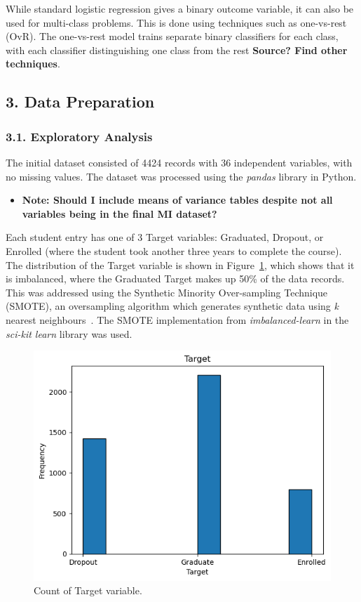 \documentclass[12pt]{article}
\begin{document}
While standard logistic regression gives a binary outcome variable, it can also be used for multi-class problems. This is done using techniques such as one-vs-rest (OvR). The one-vs-rest model trains separate binary classifiers for each class, with each classifier distinguishing one class from the rest \textbf{Source? Find other techniques}.

\newpage
\subsection*{3. Data Preparation}
\subsubsection*{3.1. Exploratory Analysis}
The initial dataset consisted of 4424 records with 36 independent variables, with no missing values. The dataset was processed using the \textit{pandas} library in Python.

\begin{itemize}
    \item{\textbf{Note: Should I include means of variance tables despite not all variables being in the final MI dataset?}}
\end{itemize}

Each student entry has one of 3 Target variables: Graduated, Dropout, or Enrolled (where the student took another three years to complete the course). The distribution of the Target variable is shown in Figure~\ref{fig:target}, which shows that it is imbalanced, where the Graduated Target makes up 50\% of the data records. This was addressed using the Synthetic Minority Over-sampling Technique (SMOTE), an oversampling algorithm which generates synthetic data using \textit{k} nearest neighbours~\cite{smote}. The SMOTE implementation from \textit{imbalanced-learn} in the \textit{sci-kit learn} library was used.

\begin{figure} [H]
    \centering
    \includegraphics[width=0.8\linewidth]{target_plot}
    \caption{Count of Target variable.}\label{fig:target}
  \end{figure}  
\end{document}
